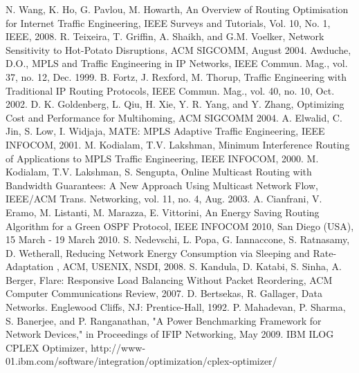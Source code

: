 \documentclass[journal]{IEEEtran}
\begin{document}
\begin{thebibliography}{1}

N. Wang, K. Ho, G. Pavlou, M. Howarth, An Overview of Routing Optimisation for Internet Traffic Engineering, IEEE Surveys and Tutorials, Vol. 10, No. 1, IEEE, 2008.
R. Teixeira, T. Griffin, A. Shaikh, and G.M. Voelker, Network Sensitivity to Hot-Potato Disruptions, ACM SIGCOMM, August 2004.
Awduche, D.O., MPLS and Traffic Engineering in IP Networks, IEEE Commun. Mag., vol. 37, no. 12, Dec. 1999.
B. Fortz, J. Rexford, M. Thorup, Traffic Engineering with Traditional IP Routing Protocols, IEEE Commun. Mag., vol. 40, no. 10, Oct. 2002.
D. K. Goldenberg, L. Qiu, H. Xie, Y. R. Yang, and Y. Zhang, Optimizing Cost and Performance for Multihoming, ACM SIGCOMM 2004.
A. Elwalid, C. Jin, S. Low, I. Widjaja, MATE: MPLS Adaptive Traffic Engineering, IEEE INFOCOM, 2001.
M. Kodialam, T.V. Lakshman, Minimum Interference Routing of Applications to MPLS Traffic Engineering, IEEE INFOCOM, 2000.
M. Kodialam, T.V. Lakshman, S. Sengupta, Online Multicast Routing with Bandwidth Guarantees: A New Approach Using Multicast Network Flow, IEEE/ACM Trans. Networking, vol. 11, no. 4, Aug. 2003.
A. Cianfrani, V. Eramo, M. Listanti, M. Marazza, E. Vittorini, An Energy Saving Routing Algorithm for a Green OSPF Protocol, IEEE INFOCOM 2010, San Diego (USA), 15 March - 19 March 2010.
S. Nedevschi, L. Popa, G. Iannaccone, S. Ratnasamy, D. Wetherall, Reducing Network Energy Consumption via Sleeping and Rate-Adaptation , ACM, USENIX, NSDI, 2008.
S. Kandula, D. Katabi, S. Sinha, A. Berger, Flare: Responsive Load Balancing Without Packet Reordering, ACM Computer Communications Review, 2007.
D. Bertsekas, R. Gallager, Data Networks. Englewood Cliffs, NJ: Prentice-Hall, 1992.
P. Mahadevan, P. Sharma, S. Banerjee, and P. Ranganathan, "A Power Benchmarking Framework for Network Devices," in Proceedings of IFIP Networking, May 2009.
IBM ILOG CPLEX Optimizer, http://www-01.ibm.com/software/integration/optimization/cplex-optimizer/
\end{thebibliography}
\end{document}
